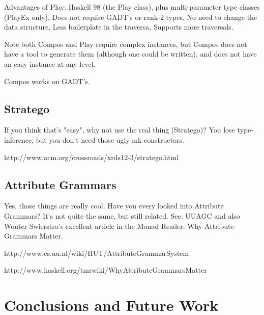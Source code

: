 \documentclass[preprint]{sigplanconf}
\begin{document}
Advantages of Play: Haskell 98 (the Play class), plus multi-parameter type classes (PlayEx only), Does not require GADT's or rank-2 types, No need to change the data structure, Less boilerplate in the traversa, Supports more traversals.

Note both Compos and Play require complex instances, but Compos does not have a tool to generate them (although one could be written), and does not have an easy instance at any level.

Compos works on GADT's.

\subsection{Stratego}

If you think that's "easy", why not use the real thing (Stratego)? You lose type-inference, but you don't need those ugly mk constructors.

http://www.acm.org/crossroads/xrds12-3/stratego.html

\subsection{Attribute Grammars}

Yes, those things are really cool. Have you every looked into Attribute Grammars? It's not quite the same, but still related. See: UUAGC and also Wouter Swierstra's excellent article in the Monad Reader: Why Attribute Grammars Matter.

http://www.cs.uu.nl/wiki/HUT/AttributeGrammarSystem

http://www.haskell.org/tmrwiki/WhyAttributeGrammarsMatter


\section{Conclusions and Future Work}
\end{document}
